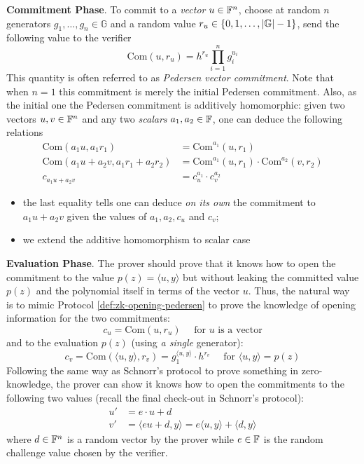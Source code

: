 \documentclass{article}
\begin{document}
\textbf{Commitment Phase}. To commit to a \textit{vector} $u \in \mathbb{F}^n$, choose at random $n$ generators $g_1, \dots, g_n \in \mathbb{G}$ and a random value $r_u \in \left\{ 0, 1, \dots, \abs{\mathbb{G}} - 1 \right\}$, send the following value to the verifier
\begin{equation*}
\text{Com} (u, r_u) = h^{r_u} \prod_{i = 1}^n g_i^{u_i}
\end{equation*}
This quantity is often referred to as \textit{Pedersen vector commitment}. Note that when $n = 1$ this commitment is merely the initial Pedersen commitment. Also, as the initial one the Pedersen commitment is additively homomorphic: given two vectors $u, v \in \mathbb{F}^n$ and any two \textit{scalars} $a_1, a_2 \in \mathbb{F}$, one can deduce the following relations
\begin{equation*}
\begin{split}
\text{Com}(a_1u, a_1r_1 ) & = \text{Com}^{a_1}(u, r_1 ) \\
\text{Com}(a_1u + a_2v, a_1r_1 + a_2r_2) & = \text{Com}^{a_1}(u, r_1 ) \cdot  \text{Com}^{a_2}(v, r_2 ) \\
c_{a_1u + a_2v} & = c_u^{a_1} \cdot c_v^{a_2}
\end{split}
\end{equation*}
\begin{itemize}
\item the last equality tells one can deduce \textit{on its own} the commitment to $a_1u + a_2v$ given the values of $a_1, a_2, c_u$ and $c_v$; 
\item we extend the additive homomorphism to scalar case
\end{itemize}

\textbf{Evaluation Phase}. The prover should prove that it knows how to open the commitment to the value $p(z) = \langle u, y \rangle$ but without leaking the committed value $p(z)$ and the polynomial itself in terms of the vector $u$. Thus, the natural way is to mimic Protocol \ref{def:zk-opening-pedersen} to prove the knowledge of opening information for the two commitments:
\begin{equation*}
c_u = \text{Com}(u, r_u) \quad \text{ for } u \text{ is a vector}
\end{equation*} 
and to the evaluation $p(z)$ (using \textit{a single} generator):
\begin{equation*}
c_{v} = \text{Com}(\langle u, y \rangle, r_v) = g_1^{\langle u, y \rangle} \cdot h^{r_v} \quad \text{ for } \langle u, y \rangle = p(z)
\end{equation*}
Following the same way as Schnorr's protocol to prove something in zero-knowledge, the prover can show it knows how to open the commitments to the following two values (recall the final check-out in Schnorr's protocol):
\begin{equation*}
\begin{split}
u' & = e \cdot u + d \\
v' & = \langle e u + d, y \rangle = e \langle u, y \rangle + \langle d, y \rangle
\end{split}
\end{equation*}
where $d \in \mathbb{F}^n$ is a random vector by the prover while $e \in \mathbb{F}$ is the random challenge value chosen by the verifier. 
\end{document}
